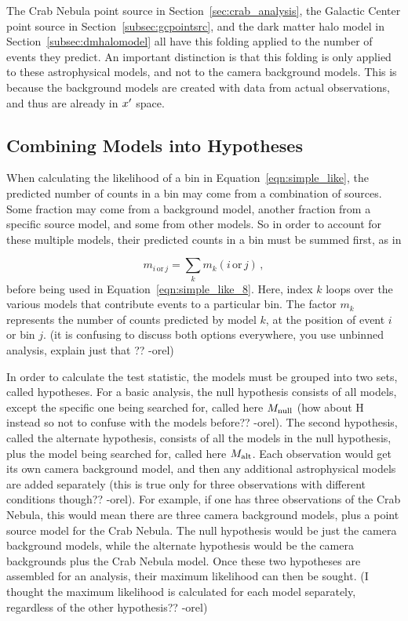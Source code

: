   The Crab Nebula point source in Section~\ref{sec:crab_analysis}, the Galactic Center point source in Section~\ref{subsec:gcpointsrc}, and the dark matter halo model in Section~\ref{subsec:dmhalomodel} all have this folding applied to the number of events they predict.
  An important distinction is that this folding is only applied to these astrophysical models, and not to the camera background models.
  This is because the background models are created with data from actual observations, and thus are already in $x'$ space.
  
  \subsection{Combining Models into Hypotheses}\label{subsec:hypotheses}
  
  When calculating the likelihood of a bin in Equation~\ref{eqn:simple_like}, the predicted number of counts in a bin may come from a combination of sources.
  Some fraction may come from a background model, another fraction from a specific source model, and some from other models.
  So in order to account for these multiple models, their predicted counts in a bin must be summed first, as in 
  
  \begin{equation}\label{eqn:combinemodels}
    m_{i\,\textrm{or}\,j} = \sum_k m_k(i\,\textrm{or}\,j) \,,
  \end{equation}
  before being used in Equation~\ref{eqn:simple_like_8}.
  Here, index $k$ loops over the various models that contribute events to a particular bin.
  The factor $m_k$ represents the number of counts predicted by model $k$, at the position of event $i$ or bin $j$.
  {\color{red}(it is confusing to discuss both options everywhere, you use unbinned analysis, explain just that ?? -orel)}
  
  In order to calculate the test statistic, the models must be grouped into two sets, called hypotheses.
  For a basic analysis, the null hypothesis consists of all models, except the specific one being searched for, called here {\color{red} $M_\textrm{null}$ (how about H instead so not to confuse with the models before?? -orel)}.
  The second hypothesis, called the alternate hypothesis, consists of all the models in the null hypothesis, plus the model being searched for, called here $M_\textrm{alt}$.
  Each observation would get its own camera background model, and then any additional astrophysical models are added separately {\color{red}(this is true only for three observations with different conditions though?? -orel)}.
  For example, if one has three observations of the Crab Nebula, this would mean there are three camera background models, plus a point source model for the Crab Nebula.
  The null hypothesis would be just the camera background models, while the alternate hypothesis would be the camera backgrounds plus the Crab Nebula model.
  Once these two hypotheses are assembled for an analysis, their maximum likelihood can then be sought.
  {\color{red}(I thought the maximum likelihood is calculated for each model separately, regardless of the other hypothesis?? -orel)}
  
